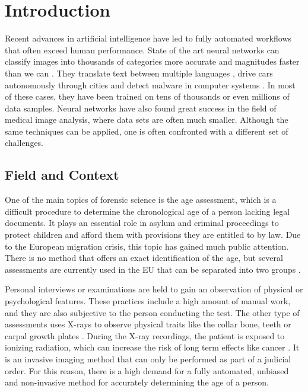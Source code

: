 \section{Introduction}

Recent advances in artificial intelligence have led to fully automated workflows that often exceed human performance. State of the art neural networks can classify images into thousands of categories more accurate and magnitudes faster than we can \cite{He2015a}. They translate text between multiple languages \cite{Wu2016}, drive cars autonomously through cities \cite{Bojarski2017} and detect malware in computer systems \cite{Saxe2015}. In most of these cases, they have been trained on tens of thousands or even millions of data samples. Neural networks have also found great success in the field of medical image analysis, where data sets are often much smaller. Although the same techniques can be applied, one is often confronted with a different set of challenges.

\subsection{Field and Context}

One of the main topics of forensic science is the age assessment, which is a difficult procedure to determine the chronological age of a person lacking legal documents. It plays an essential role in asylum and criminal proceedings to protect children and afford them with provisions they are entitled to by law. Due to the European migration crisis, this topic has gained much public attention. There is no method that offers an exact identification of the age, but several assessments are currently used in the EU that can be separated into two groups \cite{EuropeanAsylumSupportOffice2013}.

Personal interviews or examinations are held to gain an observation of physical or psychological features. These practices include a high amount of manual work, and they are also subjective to the person conducting the test. The other type of assessments uses X-rays to observe physical traits like the collar bone, teeth or carpal growth plates \cite{EuropeanAsylumSupportOffice2013}. During the X-ray recordings, the patient is exposed to ionizing radiation, which can increase the risk of long term effects like cancer \cite{WorldHealthOrganization2016}. It is an invasive imaging method that can only be performed as part of a judicial order. For this reason, there is a high demand for a fully automated, unbiased and non-invasive method for accurately determining the age of a person.


